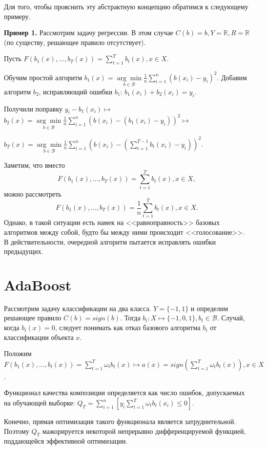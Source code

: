 \documentclass[specialist, 12pt, href]{article}
\begin{document}
Для того, чтобы прояснить эту абстрактную концепцию обратимся к следующему примеру.

\textbf{Пример 1.} Рассмотрим задачу регрессии. В этом случае $C(b) = b, Y = \mathbb{R}, R = \mathbb{R}$ (по существу, решающее правило отсутствует).

Пусть $F(b_1(x),\ldots,b_T(x)) = \sum\limits_{t = 1}^{T}{b_t(x)}, x \in X$.

Обучим простой алгоритм $b_1(x) = \underset{b \in \mathcal{B}}{\arg\min} \frac{1}{n}\sum\limits_{i = 1}^{n}{(b(x_i) - y_i)^2}$. Добавим алгоритм $b_2$, исправляющий ошибки $b_1$: $b_1(x_i) + b_2(x_i) = y_i$.

Получили поправку $y_i-b_1(x_i) \mapsto$ $b_2(x) =  \underset{b  \in \mathcal{B}}{\arg\min} \frac{1}{n}\sum\limits_{i = 1}^{n}{(b(x_i) -(b_1(x_i) - y_i))^2} \mapsto$

$b_T(x) =  \underset{b  \in \mathcal{B}}{\arg\min} \frac{1}{n}\sum\limits_{i = 1}^{n}{(b(x_i) -(\sum\limits_{t = 1}^{T-1}b_t(x_i) - y_i))^2}$.

Заметим, что вместо
$$F(b_1(x),\ldots,b_T(x)) = \sum\limits_{t = 1}^{T}{b_t(x)}, x \in X,$$
можно рассмотреть
$$F(b_1(x),\ldots,b_T(x)) = \frac{1}{n} \sum\limits_{t = 1}^{T}{b_t(x)}, x \in X.$$
Однако, в такой ситуации есть намек на <<равноправность>> базовых алгоритмов между собой, будто бы между ними происходит <<голосование>>.
В действительности, очередной алгоритм пытается исправлять ошибки предыдущих.

\section{AdaBoost}

Рассмотрим задачу классификации на два класса.
$Y = \{-1,1\}$ и определим решающее правило $C(b) = sign(b)$.
Тогда $b_t:X \mapsto \{-1,0,1\}, b_t \in \mathcal{B}$.
Случай, когда $b_t(x) = 0$, следует понимать как отказ базового алгоритма $b_t$ от классификации объекта $x$.

Положим $F(b_1(x),\dots,b_t(x)) = \sum\limits_{t = 1}^{T}{\omega_tb_t(x)} \mapsto a(x) = sign(\sum\limits_{t = 1}^{T}{\omega_tb_t(x)}), x \in X$.

Функционал качества композиции определяется как число ошибок, допускаемых на обучающей выборке: $Q_T = \sum\limits_{i=1}^n{[y_i\sum\limits_{t=1}^T\omega_tb_t(x_i) \leq 0]}$.

Конечно, прямая оптимизация такого функционала является затруднительной.
Поэтому $Q_T$ мажорируется некоторой непрерывно дифференцируемой функцией, поддающейся эффективной оптимизации.
\end{document}

